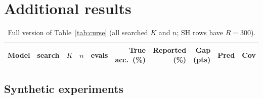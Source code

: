 \appendix
\section{Additional results}\label{app:more}
\begin{table}[h]
\caption{Full version of Table~\ref{tab:curse} (all searched $K$ and $n$; SH rows have $R{=}300$).}\label{tab:curse_full}
\centering\footnotesize\setlength{\tabcolsep}{3.5pt}
\begin{tabular}{llrrrrrrrr}
\toprule Model & search & $K$ & $n$ & evals & True acc.\ (\%) & Reported (\%) & Gap (pts) & Pred & Cov \\ \midrule
\end{tabular}
\end{table}

\subsection{Synthetic experiments}\label{app:synth}
